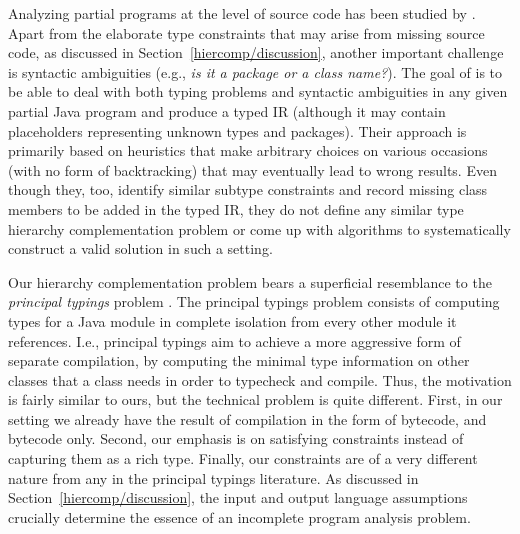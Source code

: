 Analyzing partial programs at the level of source code has been
studied by \citeauthor{oopsla/DagenaisH08}
\cite{oopsla/DagenaisH08}. Apart from the elaborate type constraints
that may arise from missing source code, as discussed in
Section~\ref{hiercomp/discussion}, another important challenge is
syntactic ambiguities (e.g., \emph{is it a package or a class
  name?}). The goal of \citeauthor{oopsla/DagenaisH08} is to be able
to deal with both typing problems and syntactic ambiguities in any
given partial Java program and produce a typed IR (although it may
contain placeholders representing unknown types and packages). Their
approach is primarily based on heuristics that make arbitrary choices
on various occasions (with no form of backtracking) that may
eventually lead to wrong results. Even though they, too, identify
similar subtype constraints and record missing class members to be
added in the typed IR, they do not define any similar type hierarchy
complementation problem or come up with algorithms to systematically
construct a valid solution in such a setting.


Our hierarchy complementation problem bears a superficial resemblance
to the \emph{principal typings} problem
\cite{popl/AnconaZ04,popl/AnconaDDZ05,Ancona04even}.  The principal
typings problem consists of computing types for a Java module in
complete isolation from every other module it references. I.e.,
principal typings aim to achieve a more aggressive form of separate
compilation, by computing the minimal type information on other
classes that a class needs in order to typecheck and compile. Thus,
the motivation is fairly similar to ours, but the technical problem is
quite different.  First, in our setting we already have the result of
compilation in the form of bytecode, and bytecode only. Second, our
emphasis is on satisfying constraints instead of capturing them as a
rich type. Finally, our constraints are of a very different nature
from any in the principal typings literature. As discussed in
Section~\ref{hiercomp/discussion}, the input and output language
assumptions crucially determine the essence of an incomplete program
analysis problem.



